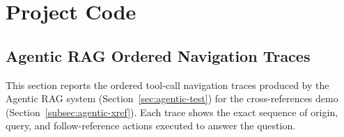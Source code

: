 \chapter{Project Code}
\label{chapter:appendixA}



\section{Agentic RAG Ordered Navigation Traces}
\label{app:agentic-navigation-traces}
This section reports the ordered tool-call navigation traces produced by the Agentic RAG system (Section~\ref{sec:agentic-test}) for the cross-references demo (Section~\ref{subsec:agentic-xref}). Each trace shows the exact sequence of origin, query, and follow-reference actions executed to answer the question.

